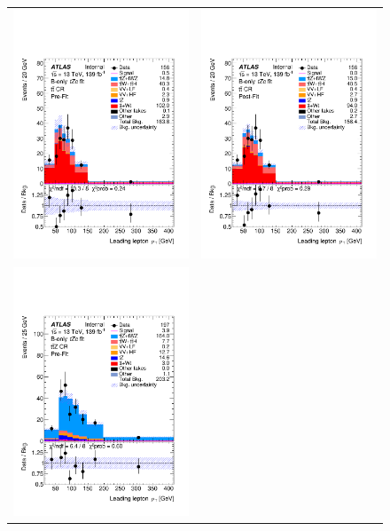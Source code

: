 \begin{figure}[htbp]
	\centering
	\begin{tabular}{cc}
		\includegraphics[width=.45\textwidth]{Appendices/AP9/figures/BONLY_CRSR_DL1rc_unblind/Plots/TTCR} &
		\includegraphics[width=.45\textwidth]{Appendices/AP9/figures/BONLY_CRSR_DL1rc_unblind/Plots/TTCR_postFit} \\
		\includegraphics[width=.45\textwidth]{Appendices/AP9/figures/BONLY_CRSR_DL1rc_unblind/Plots/TTZCR} &

\end{tabular}
\end{figure}

